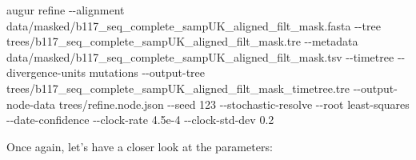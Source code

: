 \documentclass[
]{book}
\newenvironment{Shaded}{\begin{snugshade}}{\end{snugshade}}
\newcommand{\AttributeTok}[1]{\textcolor[rgb]{0.13,0.29,0.53}{#1}}
\newcommand{\ExtensionTok}[1]{#1}
\newcommand{\NormalTok}[1]{#1}
\begin{document}
\begin{Shaded}
\begin{Highlighting}[]
\ExtensionTok{augur}\NormalTok{ refine }\AttributeTok{{-}{-}alignment}\NormalTok{ data/masked/b117\_seq\_complete\_sampUK\_aligned\_filt\_mask.fasta }\AttributeTok{{-}{-}tree}\NormalTok{ trees/b117\_seq\_complete\_sampUK\_aligned\_filt\_mask.tre }\AttributeTok{{-}{-}metadata}\NormalTok{ data/masked/b117\_seq\_complete\_sampUK\_aligned\_filt\_mask.tsv }\AttributeTok{{-}{-}timetree} \AttributeTok{{-}{-}divergence{-}units}\NormalTok{ mutations }\AttributeTok{{-}{-}output{-}tree}\NormalTok{ trees/b117\_seq\_complete\_sampUK\_aligned\_filt\_mask\_timetree.tre }\AttributeTok{{-}{-}output{-}node{-}data}\NormalTok{ trees/refine.node.json }\AttributeTok{{-}{-}seed}\NormalTok{ 123 }\AttributeTok{{-}{-}stochastic{-}resolve} \AttributeTok{{-}{-}root}\NormalTok{ least{-}squares }\AttributeTok{{-}{-}date{-}confidence} \AttributeTok{{-}{-}clock{-}rate}\NormalTok{ 4.5e{-}4 }\AttributeTok{{-}{-}clock{-}std{-}dev}\NormalTok{ 0.2}
\end{Highlighting}
\end{Shaded}

Once again, let's have a closer look at the parameters:
\end{document}
